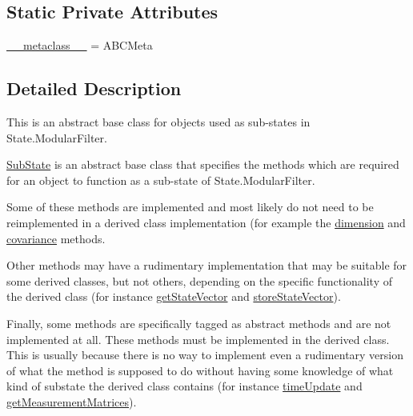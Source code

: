 \subsection*{Static Private Attributes}
\begin{DoxyCompactItemize}
\item 
\hyperlink{classmodest_1_1substates_1_1substate_1_1SubState_a31b0d49b08a8cd07b6d6e4b646d2a307}{\+\_\+\+\_\+metaclass\+\_\+\+\_\+} = A\+B\+C\+Meta
\end{DoxyCompactItemize}


\subsection{Detailed Description}
This is an abstract base class for objects used as sub-\/states in State.\+Modular\+Filter. 

\hyperlink{classmodest_1_1substates_1_1substate_1_1SubState}{Sub\+State} is an abstract base class that specifies the methods which are required for an object to function as a sub-\/state of State.\+Modular\+Filter.

Some of these methods are implemented and most likely do not need to be reimplemented in a derived class implementation (for example the \hyperlink{classmodest_1_1substates_1_1substate_1_1SubState_ab9027f6d1d7d57c47731612f519b7ee6}{dimension} and \hyperlink{classmodest_1_1substates_1_1substate_1_1SubState_a6e308aadd13962e476d2892ec728e3a5}{covariance} methods.

Other methods may have a rudimentary implementation that may be suitable for some derived classes, but not others, depending on the specific functionality of the derived class (for instance \hyperlink{classmodest_1_1substates_1_1substate_1_1SubState_a1d8050de59c58969164f577899a55aa2}{get\+State\+Vector} and \hyperlink{classmodest_1_1substates_1_1substate_1_1SubState_a3644149dc4cc19c0e32d0b7040998c96}{store\+State\+Vector}).

Finally, some methods are specifically tagged as abstract methods and are not implemented at all. These methods must be implemented in the derived class. This is usually because there is no way to implement even a rudimentary version of what the method is supposed to do without having some knowledge of what kind of substate the derived class contains (for instance \hyperlink{classmodest_1_1substates_1_1substate_1_1SubState_a06d147fa5babe4e147b3267e67054ab4}{time\+Update} and \hyperlink{classmodest_1_1substates_1_1substate_1_1SubState_a98901b80c96264945362ec50b489a636}{get\+Measurement\+Matrices}).

